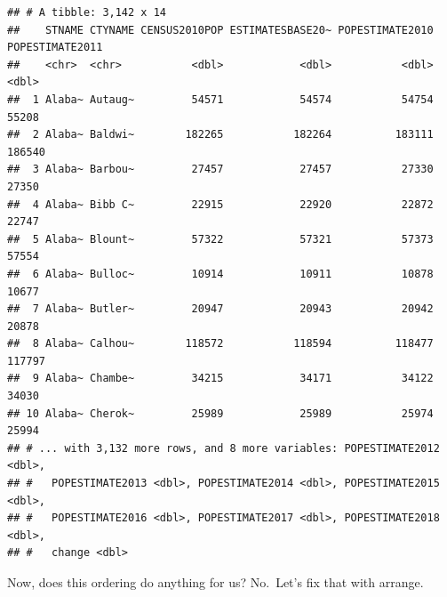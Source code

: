 \documentclass[]{book}
\newenvironment{Shaded}{\begin{snugshade}}{\end{snugshade}}
\newcommand{\DataTypeTok}[1]{\textcolor[rgb]{0.13,0.29,0.53}{#1}}
\newcommand{\DecValTok}[1]{\textcolor[rgb]{0.00,0.00,0.81}{#1}}
\newcommand{\KeywordTok}[1]{\textcolor[rgb]{0.13,0.29,0.53}{\textbf{#1}}}
\newcommand{\NormalTok}[1]{#1}
\newcommand{\OperatorTok}[1]{\textcolor[rgb]{0.81,0.36,0.00}{\textbf{#1}}}
\newcommand{\StringTok}[1]{\textcolor[rgb]{0.31,0.60,0.02}{#1}}
\begin{document}
\begin{verbatim}
## # A tibble: 3,142 x 14
##    STNAME CTYNAME CENSUS2010POP ESTIMATESBASE20~ POPESTIMATE2010 POPESTIMATE2011
##    <chr>  <chr>           <dbl>            <dbl>           <dbl>           <dbl>
##  1 Alaba~ Autaug~         54571            54574           54754           55208
##  2 Alaba~ Baldwi~        182265           182264          183111          186540
##  3 Alaba~ Barbou~         27457            27457           27330           27350
##  4 Alaba~ Bibb C~         22915            22920           22872           22747
##  5 Alaba~ Blount~         57322            57321           57373           57554
##  6 Alaba~ Bulloc~         10914            10911           10878           10677
##  7 Alaba~ Butler~         20947            20943           20942           20878
##  8 Alaba~ Calhou~        118572           118594          118477          117797
##  9 Alaba~ Chambe~         34215            34171           34122           34030
## 10 Alaba~ Cherok~         25989            25989           25974           25994
## # ... with 3,132 more rows, and 8 more variables: POPESTIMATE2012 <dbl>,
## #   POPESTIMATE2013 <dbl>, POPESTIMATE2014 <dbl>, POPESTIMATE2015 <dbl>,
## #   POPESTIMATE2016 <dbl>, POPESTIMATE2017 <dbl>, POPESTIMATE2018 <dbl>,
## #   change <dbl>
\end{verbatim}

Now, does this ordering do anything for us? No.~Let's fix that with arrange.

\begin{Shaded}
\end{Shaded}
\end{document}
